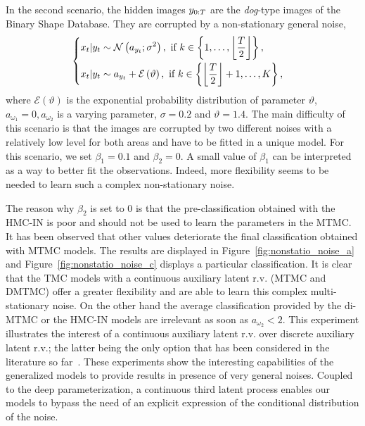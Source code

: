 In the second scenario,
the hidden images $y_{0:T}$ are the \emph{dog}-type images
of the Binary Shape Database. They are corrupted by
a non-stationary general noise,
\begin{equation}
\label{scenario-2-tmc}
    \begin{cases}
    \begin{aligned}
    &x_t|y_t \sim\mathcal{N}\left(a_{y_t};\sigma^2\right), \text{ if } k\in\left\{1,\dots,\left\lfloor\frac{T}{2}\right\rfloor\right\},\\
    &x_t|y_t\sim a_{y_t} + \mathcal{E}\left(\vartheta\right), \text{ if } k\in\left\{\left\lfloor\frac{T}{2}\right\rfloor + 1, \dots, K\right\},\\
    \end{aligned}
    \end{cases}
\end{equation}
where $\mathcal{E}(\vartheta)$ is the exponential probability distribution of parameter $\vartheta$, $a_{\omega_1}=0, a_{\omega_2}$ is a varying parameter, $\sigma=0.2$ and 
$\vartheta=1.4$.
The main difficulty of this scenario is that the images are 
corrupted by two different noises with a relatively low level for 
both areas and have to be fitted in a unique model. 
For this scenario, we set $\beta_1=0.1$ and $\beta_2=0$. 
A small value of $\beta_1$ can be interpreted as a way to better fit the observations. 
Indeed, more flexibility seems to be needed to learn such a complex non-stationary noise. 



\newpage
The reason why $\beta_2$ is set to $0$
is that the pre-classification obtained 
with the HMC-IN is poor and should not be used to learn the parameters in the MTMC. It has been observed
that other values deteriorate the 
final classification obtained with MTMC models.
The results are displayed in Figure~\ref{fig:nonstatio_noise_a} and
Figure~\ref{fig:nonstatio_noise_c} displays 
a particular classification.
It is clear that the TMC models with a continuous auxiliary latent r.v. (MTMC and DMTMC) offer a greater flexibility and are able to learn this complex multi-stationary noise. On the other hand the average classification provided by the di-MTMC or the HMC-IN models are irrelevant as soon as $a_{\omega_2}<2$.
This experiment illustrates the interest of a continuous auxiliary latent r.v. over discrete auxiliary latent r.v.; the latter being the only option that has been considered in the literature so far~\citep{gorynin2018assessing, li2019adaptive,chen2020modeling}.
These experiments show the interesting capabilities of the generalized models to provide results in presence of very general noises. Coupled to the deep parameterization,
a continuous third latent process
enables our models to bypass the need of an explicit expression of the conditional distribution of the noise.




